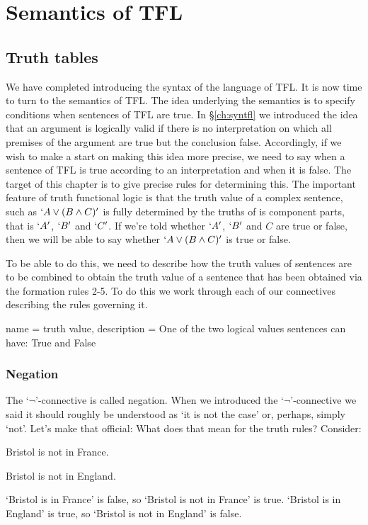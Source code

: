 \chapter{Semantics of TFL}
\section{Truth tables}\label{sec:tt}
We have completed introducing the syntax of the language of TFL. It is now time to turn to the semantics of TFL. The idea underlying the semantics is to specify conditions when sentences of TFL are true. In \S\ref{ch:syntfl} we introduced the idea that an argument is logically valid if there is no interpretation on which all premises of the argument are true but the conclusion false. Accordingly, if we wish to make a start on making this idea more precise, we need to say when a sentence of TFL is true according to an interpretation and when it is false. The target of this chapter is to give precise rules for determining this. The important feature of truth functional logic is that the truth value of a complex sentence, such as $`A\vee(B\mathbin{\wedge} C)'$ is fully determined by the truths of is component parts, that is $`A'$, $`B'$ and $`C'$. If we're told whether $`A'$, $`B'$ and $C$ are true or false, then we will be able to say whether $`A\vee(B\mathbin{\wedge} C)'$ is true or false.

To be able to do this, we need to describe how the truth values of sentences are to be combined to obtain the truth value of a sentence that has been obtained via the formation rules 2-5. To do this we work through each of our connectives describing the rules governing it.

                 {
                   name = truth value,
                   description = {One of the two logical values sentences can have: True and False}
                   }


\subsection{Negation}
The `$\neg$'-connective is called negation. When we introduced the `$\neg$'-connective we said it should roughly be understood as `it is not the case' or, perhaps, simply `not'. Let's make that official:
What does that mean for the truth rules? Consider:
\begin{earg}
\item[\ex{neg-f}] Bristol is not in France.
\item[\ex{neg-f}] Bristol is not in England.
\end{earg}
`Bristol is in France' is false, so `Bristol is not in France' is true.
`Bristol is in England' is true, so `Bristol is not in England' is false.

